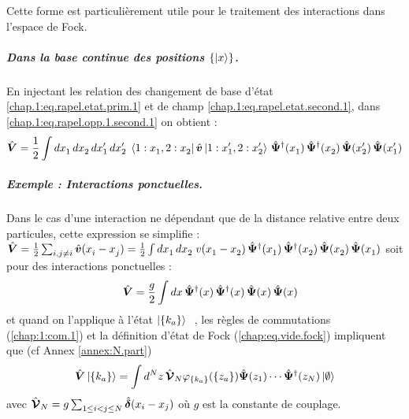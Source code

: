 Cette forme est particulièrement utile pour le traitement des interactions dans l’espace de Fock.

\subparagraph{Dans la base continue des positions \( \{ \ket{x} \} \).}

En injectant les relation des changement de base d'état
\eqref{chap.1:eq.rapel.etat.prim.1} et de champ \eqref{chap.1:eq.rapel.etat.second.1}, dans \eqref{chap.1:eq.rapel.opp.1.second.1} on obtient :
\begin{equation}
    \hat{\bm{V}} = \frac{1}{2} \int dx_1^{} \, dx_2^{} \, dx_1' \, dx_2' \; 
    \bra{ 1 : x_1^{}, 2 : x_2^{} } \hat{\bm{v}} \ket{ 1 : x_1', 2 : x_2' } \,
    \hat{\bm{\Psi}}^\dagger(x_1^{}) \, \hat{\bm{\Psi}}^\dagger(x_2^{}) \, 
    \hat{\bm{\Psi}}(x_2') \, \hat{\bm{\Psi}}(x_1')
    \label{eq:V_general}
\end{equation}

\begin{mdframed}[
	linewidth=0.5pt, 
	backgroundcolor=gray!5, 
	roundcorner=50pt,	
	innerleftmargin=5pt,
    innerrightmargin=5pt,
    innertopmargin=-10pt,
    innerbottommargin=2pt,
    leftmargin=2pt,
    rightmargin=2pt
	]
\subparagraph{Exemple : Interactions ponctuelles.} 
Dans le cas d’une interaction ne dépendant que de la distance relative entre deux particules, cette expression se simplifie :
\(
     \hat{\bm{V}} = \frac{1}{2} \sum_{i, j \ne i}  \hat{\bm{v}}(x_i^{} - x_j^{}) = 
    \frac{1}{2} \int dx_1^{} \, dx_2^{} \; v(x_1^{} - x_2^{}) \,
    \hat{\bm{\Psi}}^\dagger(x_1^{}) \, \hat{\bm{\Psi}}^\dagger(x_2^{}) \, 
    \hat{\bm{\Psi}}(x_2^{}) \, \hat{\bm{\Psi}}(x_1^{})
    \label{eq:V_local}
\) soit pour des interactions ponctuelles :	
\begin{eqnarray}
	\quad \hat{\bm{V}}  = \frac{g}{2} \int dx \,
    \hat{\bm{\Psi}}^\dagger(x) \, \hat{\bm{\Psi}}^\dagger(x) \, 
    \hat{\bm{\Psi}}(x) \, \hat{\bm{\Psi}}(x)  		
\end{eqnarray}
et quand on l'applique à l'état $\ket{\{k_a\}} $ , les règles de commutations (\ref{chap:1:com.1}) et la définition d'état de Fock (\ref{chap:eq.vide.fock}) impliquent que (cf Annex \ref{annex:N.part})
\begin{eqnarray}
\hat{\bm{V}}\ket{\{k_a \}} =  \int d^Nz \, \hat{\bm{\mathcal{V}}}_N \varphi_{\{k_a\}}( \{z_a\} )\hat{\bm{\Psi}}(z_1)\cdots \hat{\bm{\Psi}}^\dag(z_N) \ket{\emptyset} 
\end{eqnarray}
avec 
\(
	\hat{\bm{\mathcal{V}}}_N 	
 = g\sum_{1\leq i < j \leq N } \hat{\bm{\delta}}(x_i - x_j)	
\)
où \( g \) est la constante de couplage.
\end{mdframed}




